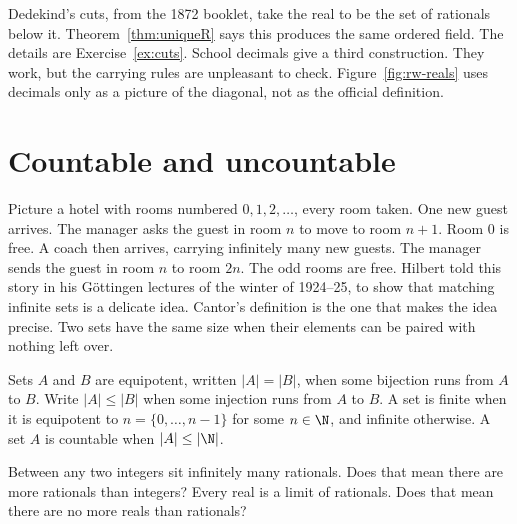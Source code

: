 Dedekind's cuts, from the 1872 booklet, take the real to be the set of rationals below it. Theorem~\ref{thm:uniqueR} says this produces the same ordered field. The details are Exercise~\ref{ex:cuts}. School decimals give a third construction. They work, but the carrying rules are unpleasant to check. Figure~\ref{fig:rw-reals} uses decimals only as a picture of the diagonal, not as the official definition.

\section{Countable and uncountable}

Picture a hotel with rooms numbered $0,1,2,\ldots$, every room taken. One new guest arrives. The manager asks the guest in room $n$ to move to room $n+1$. Room $0$ is free. A coach then arrives, carrying infinitely many new guests. The manager sends the guest in room $n$ to room $2n$. The odd rooms are free. Hilbert told this story in his G\"ottingen lectures of the winter of 1924--25, to show that matching infinite sets is a delicate idea. Cantor's definition is the one that makes the idea precise. Two sets have the same size when their elements can be paired with nothing left over.

\begin{definition}
Sets $A$ and $B$ are equipotent, written $|A|=|B|$, when some bijection runs from $A$ to $B$. Write $|A|\le|B|$ when some injection runs from $A$ to $B$. A set is finite when it is equipotent to $n=\{0,\ldots,n-1\}$ for some $n\in\N$, and infinite otherwise. A set $A$ is countable when $|A|\le|\N|$.
\end{definition}

\begin{think}
Between any two integers sit infinitely many rationals. Does that mean there are more rationals than integers? Every real is a limit of rationals. Does that mean there are no more reals than rationals?
\end{think}

